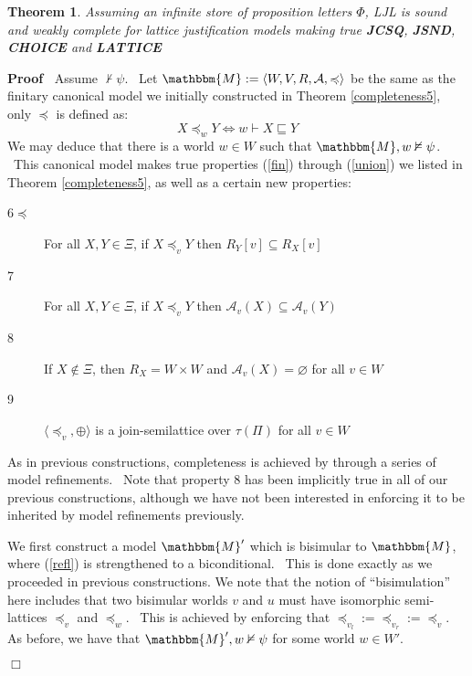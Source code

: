 \documentclass{acmconf}
\newcommand{\assign}{:=}
\newcommand{\nin}{\not\in}
\newcommand{\tmtextbf}[1]{{\bfseries{#1}}}
\newenvironment{descriptioncompact}{\begin{description} }{\end{description}}
\newenvironment{proof}{\noindent\textbf{Proof\ }}{\hspace*{\fill}$\Box$\medskip}
\newtheorem{theorem}{Theorem}
\begin{document}
\begin{theorem}
  \label{completeness6}Assuming an infinite store of proposition letters
  $\Phi$, LJL is sound and weakly complete for lattice justification models
  making true \tmtextbf{JCSQ}, \tmtextbf{JSND}, \tmtextbf{CHOICE} and
  \tmtextbf{LATTICE}
\end{theorem}

\begin{proof}
  Assume $\nvdash \psi$. \ Let $\mathbbm{M} \assign \langle W, V, R,
  \mathcal{A}, \preccurlyeq \rangle$ be the same as the finitary canonical
  model we initially constructed in Theorem \ref{completeness5}, only
  $\preccurlyeq$ is defined as:
  \[ X \preccurlyeq_w Y \Longleftrightarrow w \vdash X \sqsubseteq Y \]
  We may deduce that there is a world $w \in W$ such that $\mathbbm{M}, w
  \nvDash \psi$. \ This canonical model makes true properties (\ref{fin})
  through (\ref{union}) we listed in Theorem \ref{completeness5}, as well as a
  certain new properties:
  
  \begin{descriptioncompact}
    \item[6$\preccurlyeq$] For all $X, Y \in \Xi$, if $X \preccurlyeq_v Y$
    then $R_Y [v] \subseteq R_X [v]$
    
    \item[7] For all $X, Y \in \Xi$, if $X \preccurlyeq_v Y$ then
    $\mathcal{A}_v (X) \subseteq \mathcal{A}_v (Y)$
    
    \item[8] If $X \nin \Xi$, then $R_X = W \times W$ and $\mathcal{A}_v (X) =
    \varnothing$ for all $v \in W$
    
    \item[9] $\langle \preccurlyeq_v, \oplus \rangle$ is a join-semilattice
    over $\tau (\Pi)$ for all $v \in W$
  \end{descriptioncompact}
  
  As in previous constructions, completeness is achieved by through a series
  of model refinements. \ Note that property 8 has been implicitly true in all
  of our previous constructions, although we have not been interested in
  enforcing it to be inherited by model refinements previously.
  
  
  
  We first construct a model $\mathbbm{M}'$ which is bisimular to
  $\mathbbm{M}$, where (\ref{refl}) is strengthened to a biconditional. \ This
  is done exactly as we proceeded in previous constructions. We note that the
  notion of ``bisimulation'' here includes that two bisimular worlds $v$ and
  $u$ must have isomorphic semi-lattices $\preccurlyeq_v$ and
  $\preccurlyeq_w$. \ This is achieved by enforcing that $\preccurlyeq_{v_l}
  \assign \preccurlyeq_{v_r} \assign \preccurlyeq_v$. As before, we have that
  $\mathbbm{M}', w \nvDash \psi$ for some world $w \in W'$.
  

\end{proof}
\end{document}
